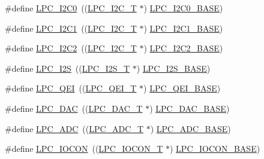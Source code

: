 \begin{DoxyCompactItemize}
\item 
\#define \hyperlink{group__PERIPH__177X__8X__BASE_ga14b6c56857e970a682a9bb22a0cb6716}{L\-P\-C\-\_\-\-I2\-C0}~((\hyperlink{structLPC__I2C__T}{L\-P\-C\-\_\-\-I2\-C\-\_\-\-T}              $\ast$) \hyperlink{group__PERIPH__407X__8X__BASE_gab4476c9e874621194369f74fcf26ce92}{L\-P\-C\-\_\-\-I2\-C0\-\_\-\-B\-A\-S\-E})
\item 
\#define \hyperlink{group__PERIPH__177X__8X__BASE_gad6d6333e47875813be171cffef258837}{L\-P\-C\-\_\-\-I2\-C1}~((\hyperlink{structLPC__I2C__T}{L\-P\-C\-\_\-\-I2\-C\-\_\-\-T}              $\ast$) \hyperlink{group__PERIPH__407X__8X__BASE_gae59f73cf24ff126be3b9a8b921926676}{L\-P\-C\-\_\-\-I2\-C1\-\_\-\-B\-A\-S\-E})
\item 
\#define \hyperlink{group__PERIPH__177X__8X__BASE_ga6bcdaa0ab66f4e3d213a488b34055557}{L\-P\-C\-\_\-\-I2\-C2}~((\hyperlink{structLPC__I2C__T}{L\-P\-C\-\_\-\-I2\-C\-\_\-\-T}              $\ast$) \hyperlink{group__PERIPH__407X__8X__BASE_ga00796bd1f1fa200bbffcd9e7e8679eaa}{L\-P\-C\-\_\-\-I2\-C2\-\_\-\-B\-A\-S\-E})
\item 
\#define \hyperlink{group__PERIPH__177X__8X__BASE_ga1d2800cab1a50bdf99efe66d6028b663}{L\-P\-C\-\_\-\-I2\-S}~((\hyperlink{structLPC__I2S__T}{L\-P\-C\-\_\-\-I2\-S\-\_\-\-T}              $\ast$) \hyperlink{group__PERIPH__407X__8X__BASE_gacff8b54e3924910d381e6b8ba804050c}{L\-P\-C\-\_\-\-I2\-S\-\_\-\-B\-A\-S\-E})
\item 
\#define \hyperlink{group__PERIPH__177X__8X__BASE_ga71347b58898f54f8e9f00a6c652c7d49}{L\-P\-C\-\_\-\-Q\-E\-I}~((\hyperlink{structLPC__QEI__T}{L\-P\-C\-\_\-\-Q\-E\-I\-\_\-\-T}              $\ast$) \hyperlink{group__PERIPH__407X__8X__BASE_ga80fa25b18324c10c8e5c26893e6f0a67}{L\-P\-C\-\_\-\-Q\-E\-I\-\_\-\-B\-A\-S\-E})
\item 
\#define \hyperlink{group__PERIPH__177X__8X__BASE_ga5b94918e9ea326d84ab862a5d377903b}{L\-P\-C\-\_\-\-D\-A\-C}~((\hyperlink{structLPC__DAC__T}{L\-P\-C\-\_\-\-D\-A\-C\-\_\-\-T}              $\ast$) \hyperlink{group__PERIPH__407X__8X__BASE_ga3bbaedad584252212d4704bb419489f6}{L\-P\-C\-\_\-\-D\-A\-C\-\_\-\-B\-A\-S\-E})
\item 
\#define \hyperlink{group__PERIPH__177X__8X__BASE_gab6eaf639d3a1eec83583a9e11ab7336f}{L\-P\-C\-\_\-\-A\-D\-C}~((\hyperlink{structLPC__ADC__T}{L\-P\-C\-\_\-\-A\-D\-C\-\_\-\-T}              $\ast$) \hyperlink{group__PERIPH__407X__8X__BASE_ga2396e0d0c565e4c1c3b2fc593bd6c37f}{L\-P\-C\-\_\-\-A\-D\-C\-\_\-\-B\-A\-S\-E})
\item 
\#define \hyperlink{group__PERIPH__177X__8X__BASE_gaabc651799ba17b0dd4a0114c8d48a145}{L\-P\-C\-\_\-\-I\-O\-C\-O\-N}~((\hyperlink{structLPC__IOCON__T}{L\-P\-C\-\_\-\-I\-O\-C\-O\-N\-\_\-\-T}            $\ast$) \hyperlink{group__PERIPH__407X__8X__BASE_gae48aea115d5924805263d7a15402d4fa}{L\-P\-C\-\_\-\-I\-O\-C\-O\-N\-\_\-\-B\-A\-S\-E})

\end{DoxyCompactItemize}
